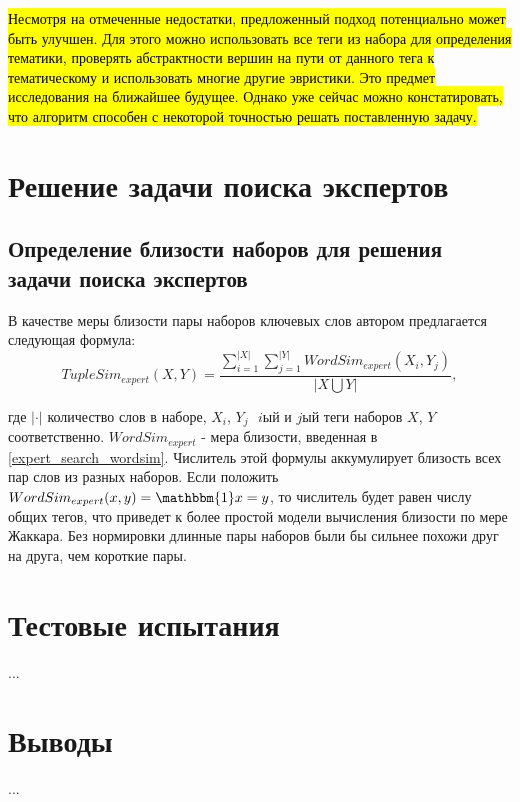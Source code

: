 \hl{Несмотря на отмеченные недостатки, предложенный подход потенциально может быть улучшен. Для этого можно использовать все теги из набора для определения тематики, проверять абстрактности вершин на пути от данного тега к тематическому и использовать многие другие эвристики. Это предмет исследования на ближайшее будущее. Однако уже сейчас можно констатировать, что алгоритм способен с некоторой точностью решать поставленную задачу.  }


\section{Решение задачи поиска экспертов} \label{expert_search_tuplesim}
\subsection{Определение близости наборов для решения задачи поиска экспертов}
В качестве меры близости пары наборов ключевых слов автором предлагается следующая формула:
$$ TupleSim_{expert}(X,Y) = \frac{\sum_{i=1}^{|X|}\sum_{j=1}^{|Y|}WordSim_{expert}(X_i, Y_j)}{|X \bigcup Y|}, $$

где $|\cdot|$ ­ количество слов в наборе, $X_i$, $Y_j$ ­ $i$­ый и $j$­ый теги наборов $X$, $Y$ соответственно. $WordSim_{expert}$ - мера близости, введенная в \ref{expert_search_wordsim}. Числитель этой формулы аккумулирует близость всех пар слов из разных наборов. Если положить $WordSim_{expert}(x, y) = \mathbbm{1}x=y$, то числитель будет равен числу общих тегов, что приведет к более простой модели вычисления близости по мере Жаккара. Без нормировки длинные пары наборов были бы сильнее похожи друг на друга, чем короткие пары.


\section{Тестовые испытания}
...
\section{Выводы}
...
